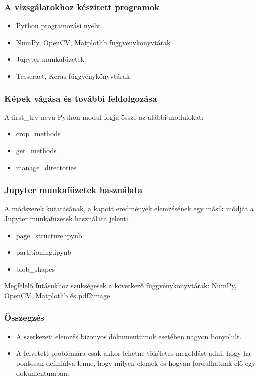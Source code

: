 \documentclass{beamer}
\begin{document}
\begin{frame}[fragile]
\frametitle{A vizsgálatokhoz készített programok}

\begin{itemize}
    \item Python programozási nyelv
    \item NumPy, OpenCV, Matplotlib függvénykönyvtárak
    \item Jupyter munkafüzetek
    \item Tesseract, Keras függvénykönyvtárak
\end{itemize}

\end{frame}

\begin{frame}[fragile]
\frametitle{Képek vágása és további feldolgozása}

A first\_try nevű Python modul fogja össze az alábbi modulokat:

\bigskip

\begin{itemize}
    \item crop\_methods
    \item get\_methods
    \item manage\_directories
\end{itemize}

\end{frame}

\begin{frame}[fragile]
\frametitle{Jupyter munkafüzetek használata}

A módszerek kutatásának, a kapott eredmények elemzésének egy másik módját a Jupyter munkafüzetek használata jelenti.

\bigskip

\begin{itemize}
    \item page\_structure.ipynb
    \item partitioning.ipynb
    \item blob\_shapes
\end{itemize}

\bigskip

Megfelelő futásukhoz szükségesek a következő függvénykönyvtárak: NumPy, OpenCV, Matplotlib és pdf2image.

\end{frame}

\begin{frame}[fragile]
\frametitle{Összegzés}

\begin{itemize}
    \item A szerkezeti elemzés bizonyos dokumentumok esetében nagyon bonyolult.
    \item A felvetett problémára csak akkor lehetne tökéletes megoldást adni, hogy ha pontosan definiálva lenne, hogy milyen elemek és hogyan fordulhatnak elő egy dokumentumban.
\end{itemize}

\end{frame}
\end{document}
